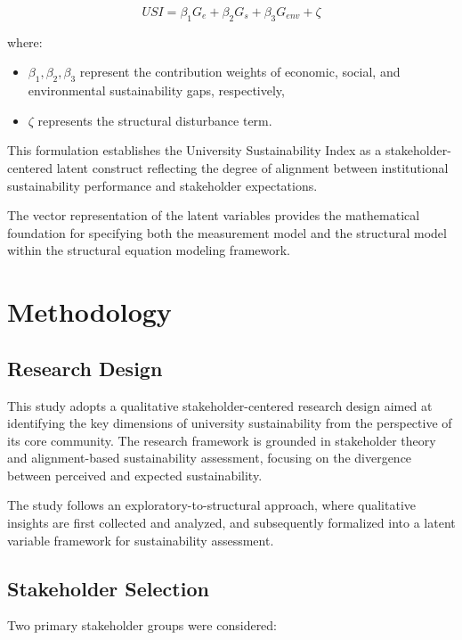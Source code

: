 \documentclass[11pt,a4paper]{article}
\begin{document}
\begin{equation}
USI = \beta_1 G_e + \beta_2 G_s + \beta_3 G_{env} + \zeta
\end{equation}

where:

\begin{itemize}
\item $\beta_1, \beta_2, \beta_3$ represent the contribution weights of economic, social, and environmental sustainability gaps, respectively,
\item $\zeta$ represents the structural disturbance term.
\end{itemize}

This formulation establishes the University Sustainability Index as a stakeholder-centered latent construct reflecting the degree of alignment between institutional sustainability performance and stakeholder expectations.

The vector representation of the latent variables provides the mathematical foundation for specifying both the measurement model and the structural model within the structural equation modeling framework.

\section{Methodology}

\subsection{Research Design}

This study adopts a qualitative stakeholder-centered research design aimed at identifying the key dimensions of university sustainability from the perspective of its core community. The research framework is grounded in stakeholder theory and alignment-based sustainability assessment, focusing on the divergence between perceived and expected sustainability.

The study follows an exploratory-to-structural approach, where qualitative insights are first collected and analyzed, and subsequently formalized into a latent variable framework for sustainability assessment.

\subsection{Stakeholder Selection}

Two primary stakeholder groups were considered:
\end{document}
